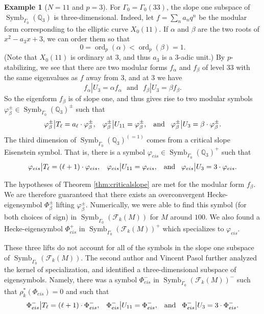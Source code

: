 \documentclass{amsart}
\theoremstyle{plain}
\theoremstyle{definition}
\newtheorem{ex}[thm]{Example}
\newcommand{\F}{{\mathcal F}}
\newcommand{\Q}{{\mathbb Q}}
\renewcommand{\sp}{{\rho^*_k}}
\newcommand{\FkM}{\F_k(M)}
\DeclareMathOperator{\ord}{ord}
\DeclareMathOperator{\Symb}{Symb}
\newcommand{\MSo}[1]{\Symb_{\Gamma_0}(#1)}
\begin{document}
\begin{ex}[$N=11$ and $p=3$]
For $\Gamma_0 = \Gamma_0(33)$, the slope one subspace of $\MSo{\Q_3}$ is three-dimensional.  Indeed, let $f = \sum_n a_n q^n$ be the modular form corresponding to the elliptic curve $X_0(11)$.  If $\alpha$ and $\beta$ are the two roots of $x^2-a_3x+3$, we can order them so that 
$$
0 = \ord_p(\alpha) < \ord_p(\beta) = 1.
$$
(Note that $X_0(11)$ is ordinary at $3$, and thus $a_3$ is a $3$-adic unit.)  By $p$-stabilizing, we see that there are two modular forms $f_\alpha$ and $f_\beta$ of level $33$ with the same eigenvalues as $f$ away from $3$, and at $3$ we have
$$
f_\alpha | U_3 = \alpha f_\alpha \text{~~and~~}
f_\beta | U_3 = \beta f_\beta.
$$
So the eigenform $f_\beta$ is of slope one, and thus gives rise to two modular symbols $\varphi_\beta^\pm \in \MSo{\Q_3}^\pm$ such that 
$$
\varphi_\beta^\pm \big| T_\ell = a_\ell \cdot \varphi_\beta^\pm, \hspace{.3cm}
\varphi_\beta^\pm \big| U_{11} =  \varphi_\beta^\pm, \hspace{.3cm}
\text{and} \hspace{.3cm}
\varphi_\beta^\pm \big| U_3 = \beta \cdot \varphi_\beta^\pm.
$$
The third dimension of $\MSo{\Q_3}^{(=1)}$ comes from a critical slope Eisenstein symbol.  That is, there is a symbol $\varphi_{eis} \in \MSo{\Q_3}^+$ such that
$$
\varphi_{eis} \big| T_\ell = (\ell + 1) \cdot \varphi_{eis}, \hspace{.3cm}
\varphi_{eis} \big| U_{11} = \varphi_{eis}, \hspace{.3cm}
\text{and} \hspace{.3cm}
\varphi_{eis} \big| U_3 = 3 \cdot \varphi_{eis}.
$$

The hypotheses of Theorem \ref{thm:criticalslope} are met for the modular form $f_\beta$.  We are therefore guaranteed that there exists an overconvergent Hecke-eigensymbol $\Phi_\beta^\pm$ lifting $\varphi_\beta^\pm$. Numerically, we were able to find this symbol (for both choices of sign) in $\MSo{\FkM}$ for $M$ around $100$.  We also found a Hecke-eigensymbol $\Phi_{eis}^+$ in $\MSo{\FkM}^+$ which specializes to $\varphi_{eis}$.  

These three lifts do not account for all of the symbols in the slope one subspace of $\MSo{\FkM}$. The second author and Vincent Pasol further analyzed the kernel of specialization, and identified a three-dimensional subspace of eigensymbols.  Namely, there was a symbol $\Phi_{eis}^-$ in $\MSo{\FkM}^-$ such that $\sp(\Phi_{eis}) = 0$ and such that
$$
\Phi_{eis}^- \big| T_\ell  = (\ell + 1)  \cdot \Phi_{eis}^-, \hspace{.3cm}
\Phi_{eis}^- \big| U_{11} = \Phi_{eis}^-, \hspace{.3cm}
\text{and} \hspace{.3cm}
\Phi_{eis}^- \big| U_3 = 3 \cdot \Phi_{eis}^-.
$$


\end{ex}
\end{document}
